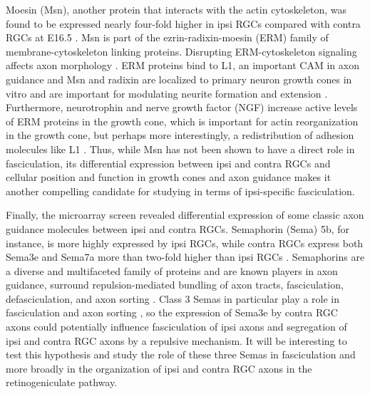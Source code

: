 Moesin (Msn), another protein that interacts with the actin cytoskeleton, was found to be expressed nearly four-fold higher in ipsi RGCs compared with contra RGCs at E16.5 \cite{wang2016ipsilateral}.
Msn is part of the ezrin-radixin-moesin (ERM) family of membrane-cytoskeleton linking proteins.
Disrupting ERM-cytoskeleton signaling affects axon morphology \cite{dickson2002functional,marsick2012activation}.
ERM proteins bind to L1, an important CAM in axon guidance \cite{dickson2002functional,marsick2012activation} and Msn and radixin are localized to primary neuron growth cones in vitro and are important for modulating neurite formation and extension \cite{paglini1998suppression}.
Furthermore, neurotrophin and nerve growth factor (NGF) increase active levels of ERM proteins in the growth cone, which is important for actin reorganization in the growth cone, but perhaps more interestingly, a redistribution of adhesion molecules like L1 \cite{marsick2012activation}.
Thus, while Msn has not been shown to have a direct role in fasciculation, its differential expression between ipsi and contra RGCs and cellular position and function in growth cones and axon guidance makes it another compelling candidate for studying in terms of ipsi-specific fasciculation.

Finally, the microarray screen revealed differential expression of some classic axon guidance molecules between ipsi and contra RGCs.
Semaphorin (Sema) 5b, for instance, is more highly expressed by ipsi RGCs, while contra RGCs express both Sema3e and Sema7a more than two-fold higher than ipsi RGCs \cite{wang2016ipsilateral}.
Semaphorins are a diverse and multifaceted family of proteins and are known players in axon guidance, surround repulsion-mediated bundling of axon tracts, fasciculation, defasciculation, and axon sorting \cite{raper2000semaphorins,tran2007semaphorin,imai2009pre,kolodkin2011mechanisms,kuwajima2012optic,zhou2013axon}.
Class 3 Semas in particular play a role in fasciculation and axon sorting \cite{raper2000semaphorins,imai2009pre,zhou2013axon}, so the expression of Sema3e by contra RGC axons could potentially influence fasciculation of ipsi axons and segregation of ipsi and contra RGC axons by a repulsive mechanism.
It will be interesting to test this hypothesis and study the role of these three Semas in fasciculation and more broadly in the organization of ipsi and contra RGC axons in the retinogeniculate pathway.

